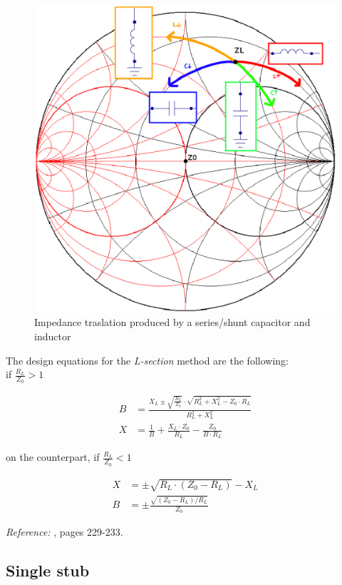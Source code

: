 \begin{figure}[H]
\centering
\includegraphics[width=120mm]{SmithChart-Lsection}
\caption{Impedance traslation produced by a series/shunt capacitor and inductor}
\label{fig:LsectionSmith}
\end{figure}


\noindent The design equations for the \textit{L-section} method are the following:\\

if $\frac{R_L}{Z_0} > 1$

\begin{align}
B & = \frac{X_L \pm \sqrt{\frac{R_L}{Z_0}} \cdot \sqrt{R_L^2 + X_L^2 - Z_0\cdot R_L}}{R_L^2 + X_L^2} \\
X & = \frac{1}{B} + \frac{X_L \cdot Z_0}{R_L} - \frac{Z_0}{B \cdot R_L}
\end{align}

\noindent on the counterpart, if $\frac{R_L}{Z_0} < 1$

\begin{align}
X & = \pm \sqrt{R_L \cdot (Z_0 - R_L)} - X_L \\
B & = \pm \frac{\sqrt{(Z_0 - R_L)/R_L}}{Z_0}
\end{align}


\noindent \textit{Reference:} \cite{Pozar}, pages 229-233.

\subsection{Single stub}

